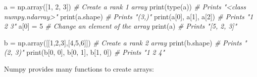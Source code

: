 \documentclass[
]{article}
\newenvironment{Shaded}{}{}
\newcommand{\BuiltInTok}[1]{#1}
\newcommand{\CommentTok}[1]{\textcolor[rgb]{0.38,0.63,0.69}{\textit{#1}}}
\newcommand{\DecValTok}[1]{\textcolor[rgb]{0.25,0.63,0.44}{#1}}
\newcommand{\NormalTok}[1]{#1}
\newcommand{\OperatorTok}[1]{\textcolor[rgb]{0.40,0.40,0.40}{#1}}
\begin{document}
\begin{Shaded}
\begin{Highlighting}[]
\NormalTok{a }\OperatorTok{=}\NormalTok{ np.array([}\DecValTok{1}\NormalTok{, }\DecValTok{2}\NormalTok{, }\DecValTok{3}\NormalTok{])   }\CommentTok{\# Create a rank 1 array}
\BuiltInTok{print}\NormalTok{(}\BuiltInTok{type}\NormalTok{(a))            }\CommentTok{\# Prints "\textless{}class \textquotesingle{}numpy.ndarray\textquotesingle{}\textgreater{}"}
\BuiltInTok{print}\NormalTok{(a.shape)            }\CommentTok{\# Prints "(3,)"}
\BuiltInTok{print}\NormalTok{(a[}\DecValTok{0}\NormalTok{], a[}\DecValTok{1}\NormalTok{], a[}\DecValTok{2}\NormalTok{])   }\CommentTok{\# Prints "1 2 3"}
\NormalTok{a[}\DecValTok{0}\NormalTok{] }\OperatorTok{=} \DecValTok{5}                  \CommentTok{\# Change an element of the array}
\BuiltInTok{print}\NormalTok{(a)                  }\CommentTok{\# Prints "[5, 2, 3]"}

\NormalTok{b }\OperatorTok{=}\NormalTok{ np.array([[}\DecValTok{1}\NormalTok{,}\DecValTok{2}\NormalTok{,}\DecValTok{3}\NormalTok{],[}\DecValTok{4}\NormalTok{,}\DecValTok{5}\NormalTok{,}\DecValTok{6}\NormalTok{]])    }\CommentTok{\# Create a rank 2 array}
\BuiltInTok{print}\NormalTok{(b.shape)                     }\CommentTok{\# Prints "(2, 3)"}
\BuiltInTok{print}\NormalTok{(b[}\DecValTok{0}\NormalTok{, }\DecValTok{0}\NormalTok{], b[}\DecValTok{0}\NormalTok{, }\DecValTok{1}\NormalTok{], b[}\DecValTok{1}\NormalTok{, }\DecValTok{0}\NormalTok{])   }\CommentTok{\# Prints "1 2 4"}
\end{Highlighting}
\end{Shaded}

Numpy provides many functions to create arrays:
\end{document}

